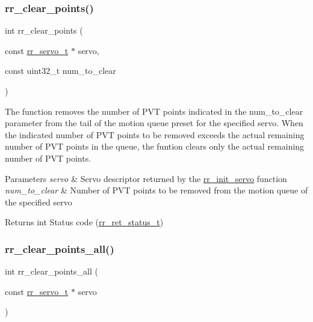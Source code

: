 \subsubsection{\texorpdfstring{rr\+\_\+clear\+\_\+points()}{rr\_clear\_points()}}
{\footnotesize\ttfamily int rr\+\_\+clear\+\_\+points (\begin{DoxyParamCaption}\item[{const \hyperlink{structrr__servo__t}{rr\+\_\+servo\+\_\+t} $\ast$}]{servo,  }\item[{const uint32\+\_\+t}]{num\+\_\+to\+\_\+clear }\end{DoxyParamCaption})}



The function removes the number of P\+VT points indicated in the \textquotesingle{}num\+\_\+to\+\_\+clear\textquotesingle{} parameter from the tail of the motion queue preset for the specified servo. When the indicated number of P\+VT points to be removed exceeds the actual remaining number of P\+VT points in the queue, the funtion clears only the actual remaining number of P\+VT points. 


\begin{DoxyParams}{Parameters}
{\em servo} & Servo descriptor returned by the \hyperlink{group___common_ga0adb313a3eeb8a4399431e940a1f3e9e}{rr\+\_\+init\+\_\+servo} function \\
\hline
{\em num\+\_\+to\+\_\+clear} & Number of P\+VT points to be removed from the motion queue of the specified servo \\
\hline
\end{DoxyParams}
\begin{DoxyReturn}{Returns}
int Status code (\hyperlink{api_8h_a92d5be5038abcf89837faf85a08debdc}{rr\+\_\+ret\+\_\+status\+\_\+t}) 
\end{DoxyReturn}
\mbox{\label{group___servo__control_ga19472cd90ae91f9b9f49edf4f52f35a2}} 
\subsubsection{\texorpdfstring{rr\+\_\+clear\+\_\+points\+\_\+all()}{rr\_clear\_points\_all()}}
{\footnotesize\ttfamily int rr\+\_\+clear\+\_\+points\+\_\+all (\begin{DoxyParamCaption}\item[{const \hyperlink{structrr__servo__t}{rr\+\_\+servo\+\_\+t} $\ast$}]{servo }\end{DoxyParamCaption})}



